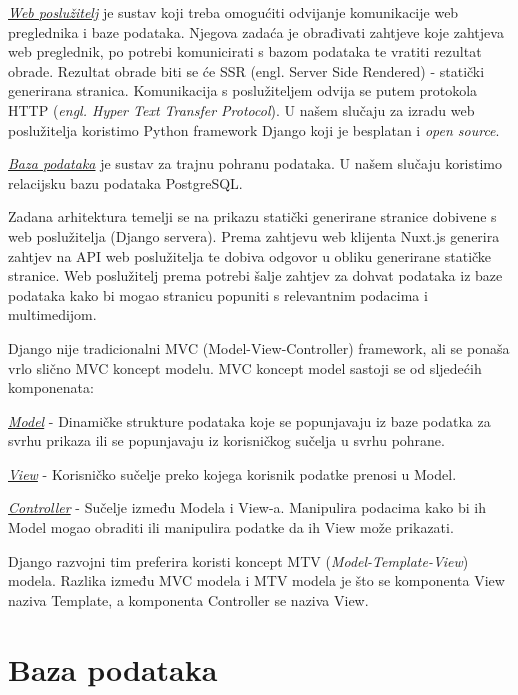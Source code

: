 	\underline{\textit{Web poslužitelj}} je sustav koji treba omogućiti odvijanje komunikacije web preglednika i baze podataka. Njegova zadaća je obrađivati zahtjeve koje zahtjeva web preglednik, po potrebi komunicirati s bazom podataka te vratiti rezultat obrade. Rezultat obrade biti se će SSR (engl. Server Side Rendered) - statički generirana stranica. Komunikacija s poslužiteljem odvija se putem protokola HTTP (\emph{engl. Hyper Text Transfer Protocol}). U našem slučaju za izradu web poslužitelja koristimo Python framework Django koji je besplatan i \emph{open source}.

	\underline{\textit{Baza podataka}} je sustav za trajnu pohranu podataka. U našem slučaju koristimo relacijsku bazu podataka PostgreSQL.

	Zadana arhitektura temelji se na prikazu statički generirane stranice dobivene s web poslužitelja (Django servera). Prema zahtjevu web klijenta Nuxt.js generira zahtjev na API web poslužitelja te dobiva odgovor u obliku generirane statičke stranice. Web poslužitelj prema potrebi šalje zahtjev za dohvat podataka iz baze podataka kako bi mogao stranicu popuniti s relevantnim podacima i multimedijom.

	Django nije tradicionalni MVC (Model-View-Controller) framework, ali se ponaša vrlo slično MVC koncept modelu. MVC koncept model sastoji se od sljedećih komponenata: 
	\begin{packed_item}
		\item{\underline{\textit{Model}} - Dinamičke strukture podataka koje se popunjavaju iz baze podatka za svrhu prikaza ili se popunjavaju iz korisničkog sučelja u svrhu pohrane.}
		\item{\underline{\textit{View}} - Korisničko sučelje preko kojega korisnik podatke prenosi u Model.}
		\item{\underline{\textit{Controller}} - Sučelje između Modela i View-a. Manipulira podacima kako bi ih Model mogao obraditi ili manipulira podatke da ih View može prikazati.}
	\end{packed_item}

	Django razvojni tim preferira koristi koncept MTV (\emph{Model-Template-View}) modela. Razlika između MVC modela i MTV modela je što se komponenta View naziva Template, a komponenta Controller se naziva View.

	\pagebreak
				
	\section{Baza podataka}
		
